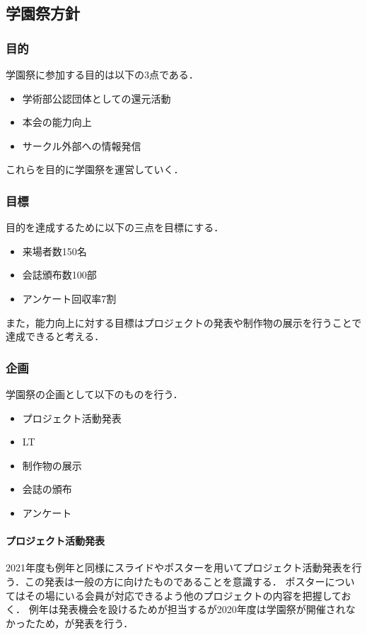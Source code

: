 \subsection*{学園祭方針}


\subsubsection{目的}
学園祭に参加する目的は以下の3点である．
\begin{itemize}
    \item 学術部公認団体としての還元活動
    \item 本会の能力向上
    \item サークル外部への情報発信
\end{itemize}
これらを目的に学園祭を運営していく．
\subsubsection{目標}
目的を達成するために以下の三点を目標にする．
\begin{itemize}
    \item 来場者数150名
    \item 会誌頒布数100部
    \item アンケート回収率7割
\end{itemize}
また，能力向上に対する目標はプロジェクトの発表や制作物の展示を行うことで達成できると考える．
\subsubsection{企画}
学園祭の企画として以下のものを行う．
\begin{itemize}
    \item プロジェクト活動発表
    \item LT
    \item 制作物の展示
    \item 会誌の頒布
    \item アンケート
\end{itemize}
\paragraph{プロジェクト活動発表}
2021年度も例年と同様にスライドやポスターを用いてプロジェクト活動発表を行う．この発表は一般の方に向けたものであることを意識する．
ポスターについてはその場にいる会員が対応できるよう他のプロジェクトの内容を把握しておく．
例年は発表機会を設けるため\firstGrade{}が担当するが2020年度は学園祭が開催されなかったため\firstGrade{}，\secondGrade{}が発表を行う．
